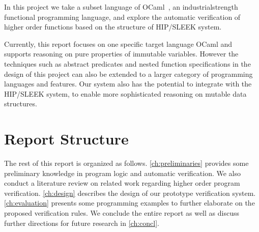 In this project we take a subset language of OCaml~\cite{OCaml}, an industrial\zz{}strength functional programming language, and explore the automatic verification of higher order functions based on the structure of HIP/SLEEK system.

Currently, this report focuses on one specific target language OCaml and supports reasoning
on pure properties of immutable variables. However the techniques such as abstract
predicates and nested function specifications in the design of this project can also be extended
to a larger category of programming languages and features. Our system also has the potential
to integrate with the HIP/SLEEK system, to enable more sophisticated reasoning on mutable
data structures.


\section{Report Structure}

The rest of this report is organized as follows. 
\autoref{ch:preliminaries} provides some preliminary knowledge in program logic and automatic verification. We also conduct a literature review on related work regarding higher order program verification. 
\autoref{ch:design} describes the design of our prototype verification system.
\autoref{ch:evaluation} presents some programming examples to further elaborate on the proposed verification rules.
We conclude the entire report as well as discuss further directions for future research in \autoref{ch:concl}.
